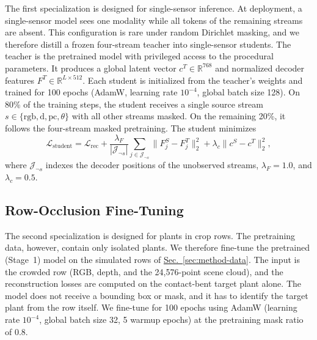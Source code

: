 \documentclass[10pt,twocolumn,letterpaper]{article}
\newcommand{\secref}[1]{\hyperref[#1]{Sec.~\ref*{#1}}}
\providecommand{\R}{\mathbb{R}}
\begin{document}
The first specialization is designed for single-sensor inference. At deployment, a single-sensor model sees one modality while all tokens of the remaining streams are absent. This configuration is rare under random Dirichlet masking, and we therefore distill a frozen four-stream teacher into single-sensor students. The teacher is the pretrained model with privileged access to the procedural parameters. %
It produces a global latent vector $c^T \in \R^{768}$ and normalized decoder features $F^T \in \R^{L \times 512}$. Each student is initialized from the teacher's weights and trained for 100 epochs (AdamW, learning rate $10^{-4}$, global batch size 128). On 80\% of the training steps, the student receives a single source stream $s \in \{\mathrm{rgb}, \mathrm{d}, \mathrm{pc}, \theta\}$ with all other streams masked. On the remaining 20\%, it follows the four-stream masked pretraining. The student minimizes
\begin{equation}
  \mathcal{L}_{\mathrm{student}} = \mathcal{L}_{\mathrm{rec}} + \frac{\lambda_F}{|\mathcal{J}_{\neg s}|} \sum_{j \in \mathcal{J}_{\neg s}} \|F^S_j - F^T_j\|_2^2 + \lambda_c \|c^S - c^T\|_2^2,
  \label{eq:distillation-loss}
\end{equation}
where $\mathcal{J}_{\neg s}$ indexes the decoder positions of the unobserved streams, $\lambda_F = 1.0$, and $\lambda_c = 0.5$. %


\subsection{Row-Occlusion Fine-Tuning}
\label{sec:method-rows}

The second specialization is designed for plants in crop rows. The pretraining data, however, contain only isolated plants. We therefore fine-tune the pretrained (Stage~1) model on the simulated rows of \secref{sec:method-data}. The input is the crowded row (RGB, depth, and the 24{,}576-point scene cloud), and the reconstruction losses are computed on the contact-bent target plant alone. The model does not receive a bounding box or mask, and it has to identify the target plant from the row itself. We fine-tune for 100 epochs using AdamW (learning rate $10^{-4}$, global batch size 32, 5 warmup epochs) at the pretraining mask ratio of 0.8.
\end{document}

